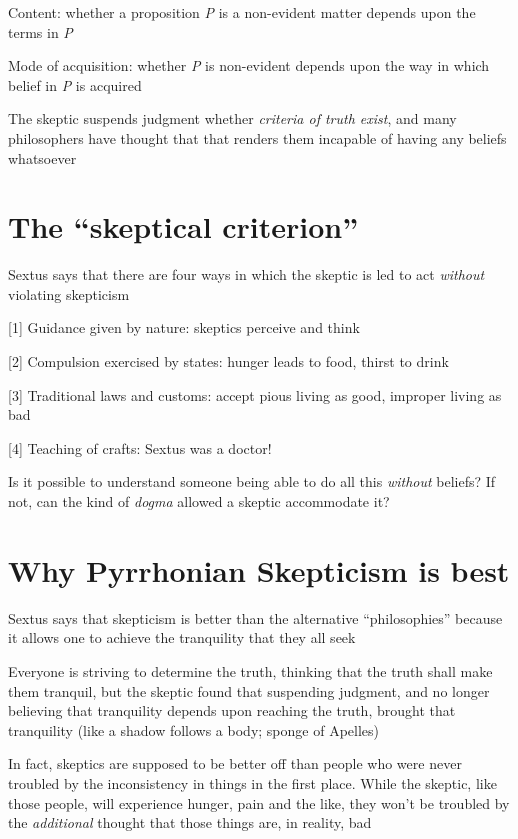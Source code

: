 \documentclass[11pt]{article}
\begin{document}
Content: whether a proposition \emph{P} is a non-evident matter depends upon the terms in \emph{P}
\vspace*{1mm}

Mode of acquisition: whether \emph{P} is non-evident depends upon the way in which belief in \emph{P} is acquired
\vspace*{2mm}

\noindent The skeptic suspends judgment whether \emph{criteria of truth exist}, and many philosophers have thought that that renders them incapable of having any beliefs whatsoever

\section*{The ``skeptical criterion''}

\noindent Sextus says that there are four ways in which the skeptic is led to act \emph{without} violating skepticism
\vspace*{2mm}

[1] Guidance given by nature: skeptics perceive and think
\vspace*{1mm}

[2] Compulsion exercised by states: hunger leads to food, thirst to drink
\vspace*{1mm}

[3] Traditional laws and customs: accept pious living as good, improper living as bad
\vspace*{1mm}

[4] Teaching of crafts: Sextus was a doctor!
\vspace*{2mm}

\noindent Is it possible to understand someone being able to do all this \emph{without} beliefs? If not, can the kind of \emph{dogma} allowed a skeptic accommodate it?

\section*{Why Pyrrhonian Skepticism is best}

\noindent Sextus says that skepticism is better than the alternative ``philosophies'' because it allows one to achieve the tranquility that they all seek
\vspace*{2mm}

\noindent Everyone is striving to determine the truth, thinking that the truth shall make them tranquil, but the skeptic found that suspending judgment, and no longer believing that tranquility depends upon reaching the truth, brought that tranquility (like a shadow follows a body; sponge of Apelles)
\vspace*{2mm}

\noindent In fact, skeptics are supposed to be better off than people who were never troubled by the inconsistency in things in the first place. While the skeptic, like those people, will experience hunger, pain and the like, they won't be troubled by the \emph{additional} thought that those things are, in reality, bad 
\end{document}
